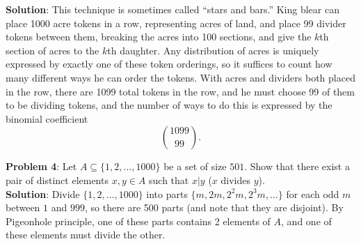 \documentclass{amsart}
\begin{document}
	\textbf{Solution}: This technique is sometimes called ``stars and bars.'' King blear can place 1000 acre tokens in a row, representing acres of land, and place 99 divider tokens between them, breaking the acres into 100 sections, and give the $k$th section of acres to the $k$th daughter. Any distribution of acres is uniquely expressed by exactly one of these token orderings, so it suffices to count how many different ways he can order the tokens. With acres and dividers both placed in the row, there are 1099 total tokens in the row, and he must choose 99 of them to be dividing tokens, and the number of ways to do this is expressed by the binomial coefficient
	$$
	{1099 \choose 99}.
	$$
	
	\noindent \textbf{Problem 4}: Let $A\subseteq \{1,2,\dots,1000\}$ be a set of size $501$. Show that there exist a pair of distinct elements $x,y\in A$ such that $x|y$ ($x$ divides $y$).\\
	
	\textbf{Solution}: Divide $\{1,2,\dots,1000\}$ into parts $\{m,2m,2^2m,2^3m,\dots\}$ for each odd $m$ between $1$ and $999$, so there are 500 parts (and note that they are disjoint). By Pigeonhole principle, one of these parts contains 2 elements of $A$, and one of these elements must divide the other.\\
	
	
	
\end{document}
